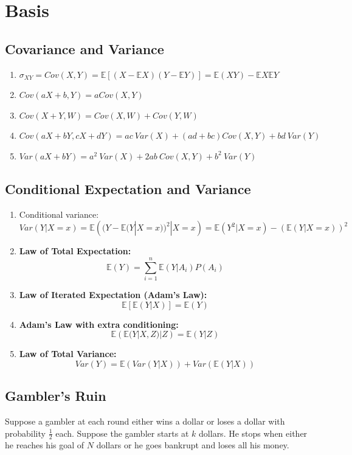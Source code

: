 \documentclass[11pt,a4paper]{article}
\begin{document}
\section{Basis}
\subsection{Covariance and Variance}
\begin{enumerate}[(1)]
    \item $\sigma_{XY}=Cov(X,Y)=\mathbb{E}\left[(X-\mathbb{E}X)(Y-\mathbb{E}Y)\right]=\mathbb{E}(XY)-\mathbb{E}X\mathbb{E}Y$
    \item $Cov(aX+b,Y)=aCov(X,Y)$
    \item $Cov(X+Y,W)=Cov(X,W)+Cov(Y,W)$
    \item $Cov(aX+bY,cX+dY)=ac\ {Var}(X)+(ad+bc)Cov(X,Y)+bd\ {Var}(Y)$
    \item $Var(aX+bY)=a^2\ {Var}(X)+2ab\ Cov(X,Y)+b^2\ {Var}(Y)$
\end{enumerate}
\subsection{Conditional Expectation and Variance}
\begin{enumerate}[(1)]
    \item Conditional variance: $$Var(Y|X=x)=\mathbb{E}\left((Y-\mathbb{E}(Y|X=x))^2|X=x\right)
    =\mathbb{E}(Y^2|X=x)-(\mathbb{E}(Y|X=x))^2$$
    \item \textbf{Law of Total Expectation:} $$\mathbb{E}(Y)=\sum_{i=1}^n \mathbb{E}(Y|A_i)P(A_i)$$
    \item \textbf{Law of Iterated Expectation (Adam's Law):}
    $$\mathbb{E}\left[\mathbb{E}(Y|X)\right]=\mathbb{E}(Y)$$
    \item \textbf{Adam's Law with extra conditioning:} $$\mathbb{E}\left(\mathbb{E}(Y|X,Z)|Z\right)=\mathbb{E}(Y|Z)$$
    \item \textbf{Law of Total Variance:}$$Var(Y)=\mathbb{E}(Var(Y|X))+Var(\mathbb{E}(Y|X))$$
\end{enumerate}

\subsection{Gambler's Ruin}
Suppose a gambler at each round either wins a dollar or loses a dollar with probability $\frac{1}{2}$ each. Suppose the gambler starts at $k$ dollars. He stops when either he reaches his goal of $N$ dollars or he goes bankrupt and loses all his money.
\end{document}
